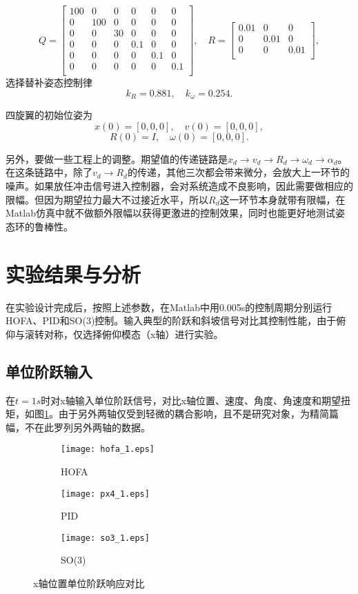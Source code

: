 $$Q=\begin{bmatrix}
  100&0&0&0&0&0\\
  0&100&0&0&0&0\\
  0&0&30&0&0&0\\
  0&0&0&0.1&0&0\\
  0&0&0&0&0.1&0\\
  0&0&0&0&0&0.1\\
\end{bmatrix}, \quad R=\begin{bmatrix}
  0.01 &0 &0\\
  0 &0.01 &0\\
  0 &0 &0.01\\
\end{bmatrix},$$
选择替补姿态控制律
$$k_R=0.881 ,\quad k_\omega=0.254.$$

四旋翼的初始位姿为
$$x(0)=[0,0,0],\quad v(0)=[0,0,0],$$
$$R(0)=I , \quad \omega(0)=[0,0,0].$$

另外，要做一些工程上的调整。期望值的传递链路是$x_d \to v_d \to R_d \to \omega_d \to \alpha_d$。在这条链路中，除了$ v_d \to R_d$的传递，其他三次都会带来微分，会放大上一环节的噪声。如果放任冲击信号进入控制器，会对系统造成不良影响，因此需要做相应的限幅。但因为期望拉力最大不过接近水平，所以$R_d$这一环节本身就带有限幅，在Matlab仿真中就不做额外限幅以获得更激进的控制效果，同时也能更好地测试姿态环的鲁棒性。

\section{实验结果与分析}

  在实验设计完成后，按照上述参数，在Matlab中用0.005s的控制周期分别运行HOFA、PID和SO(3)控制。输入典型的阶跃和斜坡信号对比其控制性能，由于俯仰与滚转对称，仅选择俯仰模态（x轴）进行实验。

\subsection*{单位阶跃输入}

  在$t=1s$时对x轴输入单位阶跃信号，对比x轴位置、速度、角度、角速度和期望扭矩，如图\ref{matlab_阶跃}。由于另外两轴仅受到轻微的耦合影响，且不是研究对象，为精简篇幅，不在此罗列另外两轴的数据。
\newpage
\newpage
\begin{figure}[!htp]
  \centering
  \begin{subfigure}[t]{0.49\textwidth}
    \centering
    \texttt{[image: hofa\_1.eps]}
    \caption{HOFA}
  \end{subfigure}\hfill
  \begin{subfigure}[t]{0.49\textwidth}
    \centering
    \texttt{[image: px4\_1.eps]}
    \caption{PID}
  \end{subfigure}\hfill
  \begin{subfigure}[t]{0.49\textwidth}
    \centering
    \texttt{[image: so3\_1.eps]}
    \caption{SO(3)}
  \end{subfigure}
  \caption{x轴位置单位阶跃响应对比}
  \label{matlab_阶跃}
\end{figure}

